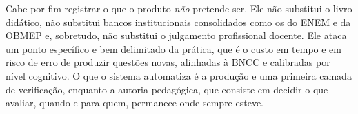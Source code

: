 Cabe por fim registrar o que o produto \emph{não} pretende ser. Ele não substitui o livro didático,
não substitui bancos institucionais consolidados como os do ENEM e da OBMEP e, sobretudo, não
substitui o julgamento profissional docente. Ele ataca um ponto específico e bem delimitado da
prática, que é o custo em tempo e em risco de erro de produzir questões novas, alinhadas à BNCC e
calibradas por nível cognitivo. O que o sistema automatiza é a produção e uma primeira camada de
verificação, enquanto a autoria pedagógica, que consiste em decidir o que avaliar, quando e para
quem, permanece onde sempre esteve.
